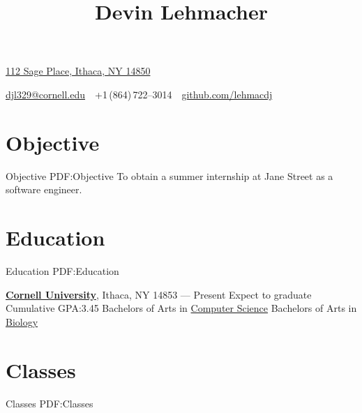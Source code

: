 \documentclass[letterpaper,10pt,oneside]{simpleresume}
\newcommand{\CVAuthor}{Devin Lehmacher}
\newcommand{\CVCompany}{Jane Street}
\newcommand{\CVWebpage}{github.com/lehmacdj}
\begin{document}
\begin{minipage}[t][0pt]{\linewidth}
\pagestyle{empty}

\title{\CVAuthor}

\begin{subtitle}
\href{https://www.google.com/maps/place/112+Sage+Pl+Room-B09,+Ithaca,+NY+14850}
{112 Sage Place, Ithaca, NY 14850}
\par
\href{mailto:djl329@cornell.edu}
{djl329@cornell.edu}
\,\SubBulletSymbol\,
+1\,(864)\,722--3014
\,\SubBulletSymbol\,
\href{https://\CVWebpage}
{\CVWebpage}
\end{subtitle}

\begin{body}

\section%
{Objective}
{Objective}
{PDF:Objective}
To obtain a summer internship at \CVCompany{} as a software engineer.

\section%
{Education}
{Education}
{PDF:Education}

\href{https://www.cornell.edu}
{\textbf{Cornell University}},
Ithaca, NY 14853
\hfill
{} --- Present
\BulletItem%
Expect to graduate 
\BulletItem%
Cumulative GPA:\@ 3.45
\BulletItem%
Bachelors of Arts in
\href{https://www.cs.cornell.edu}{Computer Science}
\BulletItem%
Bachelors of Arts in
\href{https://www.biology.cornell.edu}{Biology}

\section%
{Classes}
{Classes}
{PDF:Classes}


\end{body}
\end{minipage}
\end{document}
